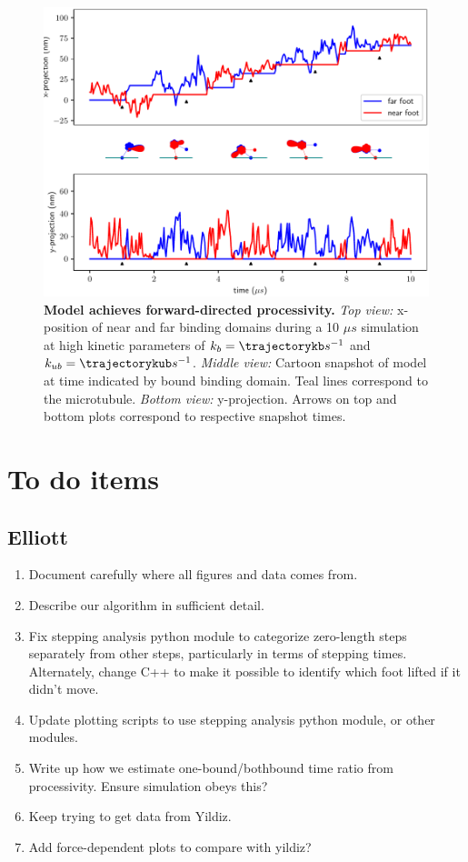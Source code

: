 \documentclass[9pt,twocolumn,twoside]{pnas-new}
\begin{document}
\begin{figure}[tbhp]
\centering
\includegraphics[width=\linewidth]{../../plots/paper_trajectory_plot.pdf}
\caption{\textbf{Model achieves forward-directed processivity.} \textit{Top view:} x-position of near and far binding domains during a 10 $\mu s$ simulation at high kinetic parameters of $k_b = \trajectorykb s^{-1}$ and $k_{ub} = \trajectorykub s^{-1}$. \textit{Middle view:} Cartoon snapshot of model at time indicated by bound binding domain. Teal lines correspond to the microtubule. \textit{Bottom view:} y-projection. Arrows on top and bottom plots correspond to respective snapshot times.}
\label{fig:trajectory}
\end{figure}

\showmatmethods

\section{To do items}

\subsection{Elliott}
\begin{enumerate}
\item Document carefully where all figures and data comes from.
\item Describe our algorithm in sufficient detail.
\item Fix stepping analysis python module to categorize zero-length
  steps separately from other steps, particularly in terms of stepping
  times.  Alternately, change C++ to make it possible to identify
  which foot lifted if it didn't move.
\item Update plotting scripts to use stepping analysis python module,
  or other modules.
\item Write up how we estimate one-bound/bothbound time ratio from
  processivity.  Ensure simulation obeys this?
\item Keep trying to get data from Yildiz.
\item Add force-dependent plots to compare with yildiz?
\end{enumerate}
\end{document}
